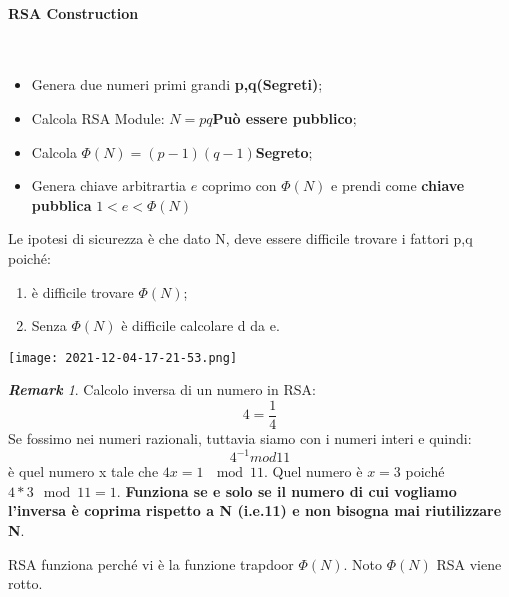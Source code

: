 \documentclass{article}
\theoremstyle{remark}
\newtheorem*{remark}{\textbf{Remark}}
\begin{document}
\paragraph{RSA Construction}\mbox{}\\
\begin{itemize}
	\item Genera due numeri primi grandi \textbf{p,q(Segreti)};
	\item Calcola RSA Module: \(N=pq\)\textbf{Può essere pubblico};
	\item Calcola \(\Phi(N)=(p-1)(q-1)\)\textbf{Segreto};
	\item Genera chiave arbitrartia \(e\) coprimo con \(\Phi(N)\) e prendi come \textbf{chiave pubblica} \(1<e<\Phi(N)\)
\end{itemize}
Le ipotesi di sicurezza è che dato N, deve essere difficile trovare i fattori p,q poiché:\begin{enumerate}
	\item è difficile trovare \(\Phi(N)\);
	\item Senza \(\Phi(N)\) è difficile calcolare d da e.
\end{enumerate}
\begin{center}
	\texttt{[image: 2021-12-04-17-21-53.png]}
\end{center}
\begin{remark}
	Calcolo inversa di un numero in RSA:
	\begin{equation}
		4=\frac{1}{4}
	\end{equation}
	Se fossimo nei numeri razionali, tuttavia siamo con i numeri interi e quindi:
	\begin{equation}
		4^{-1}mod 11
	\end{equation}
	è quel numero x tale che \(4x=1\ \mod{11}\).\newline
	Quel numero è \(x=3\) poiché \(4*3 \mod{11}=1\). \newline
	\textbf{Funziona se e solo se il numero di cui vogliamo l'inversa è coprima rispetto a N (i.e.11) e non bisogna mai riutilizzare N}.
\end{remark}
RSA funziona perché vi è la funzione trapdoor \(\Phi(N)\). Noto \(\Phi(N)\) RSA viene rotto.
\end{document}
